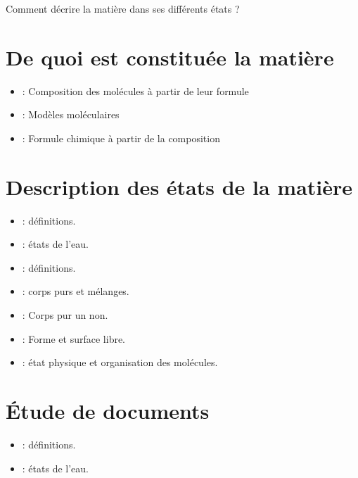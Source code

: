\documentclass[12pt,a4paper]{article}
\date{}
\title{}
\begin{document}
	
	



\begin{mypb}
	\begin{center}
		{\Large Comment décrire la matière dans ses différents états ?}
	\end{center}
\end{mypb}


\section{De quoi est constituée la matière}








\begin{myexos}
	\begin{itemize}
		\item {} : Composition des molécules à partir de leur formule
		\item {} : Modèles moléculaires
		\item {} : Formule chimique à partir de la composition
	\end{itemize}
\end{myexos}

\section{Description des états de la matière}





\begin{myexos}
	\begin{itemize}
		\item {} : définitions.
		\item {} : états de l'eau.
		\item {} : définitions.
		\item {} : corps purs et mélanges.
		\item {} : Corps pur un non.
		\item {} : Forme et surface libre.
		\item {} : état physique et organisation des molécules.
	\end{itemize}
\end{myexos}

\section{Étude de documents}


\begin{myexos}
	\begin{itemize}
		\item {} : définitions.
		\item {} : états de l'eau.
		
	\end{itemize}
\end{myexos}

\appendix

\end{document}
